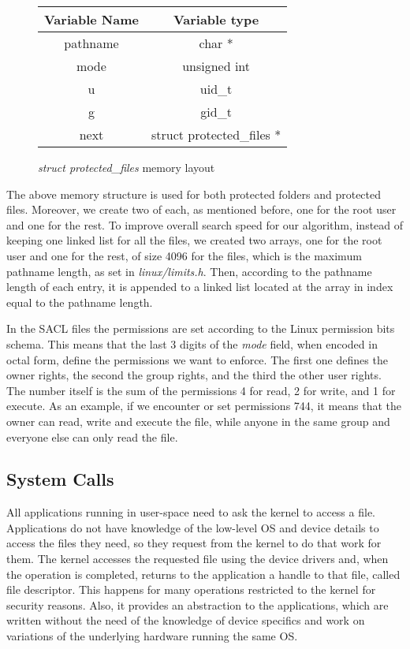 \begin{figure}[ht]
	\centering
	\begin{tabular}{|c|c|}
		\hline
		\textbf{Variable Name} & \textbf{Variable type} \\
		\hline
		pathname & char * \\
		\hline
		mode & unsigned int \\
		\hline
		u & uid\_t \\
		\hline
		g & gid\_t \\
		\hline
		next & struct protected\_files * \\
		\hline
	\end{tabular}
	\caption{\textit{struct protected\_files} memory layout}
	\label{fig:sacl_layout}
\end{figure}

\par The above memory structure is used for both protected folders and protected files. Moreover, we create two of each, as mentioned before, one for the root user and one for the rest. To improve overall search speed for our algorithm, instead of keeping one linked list for all the files, we created two arrays, one for the root user and one for the rest, of size 4096 for the files, which is the maximum pathname length, as set in \textit{linux/limits.h}. Then, according to the pathname length of each entry, it is appended to a linked list located at the array in index equal to the pathname length.

\par In the \ac{SACL} files the permissions are set according to the Linux permission bits schema. This means that the last 3 digits of the \textit{mode} field, when encoded in octal form, define the permissions we want to enforce. The first one defines the owner rights, the second the group rights, and the third the other user rights. The number itself is the sum of the permissions 4 for read, 2 for write, and 1 for execute. As an example, if we encounter or set permissions 744, it means that the owner can read, write and execute the file, while anyone in the same group and everyone else can only read the file.

\subsection{System Calls}\label{sub:syscalls}
All applications running in user-space need to ask the kernel to access a file. Applications do not have knowledge of the low-level \ac{OS} and device details to access the files they need, so they request from the kernel to do that work for them. The kernel accesses the requested file using the device drivers and, when the operation is completed, returns to the application a handle to that file, called file descriptor. This happens for many operations restricted to the kernel for security reasons. Also, it provides an abstraction to the applications, which are written without the need of the knowledge of device specifics and work on variations of the underlying hardware running the same \ac{OS}. 

